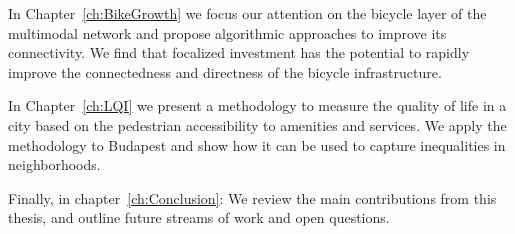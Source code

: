 In Chapter~\ref{ch:BikeGrowth} we focus our attention on the bicycle layer of the multimodal network and propose algorithmic approaches to improve its connectivity. We find that focalized investment has the potential to rapidly improve the connectedness and directness of the bicycle infrastructure.

In Chapter~\ref{ch:LQI} we present a methodology to measure the quality of life in a city based on the pedestrian accessibility to amenities and services. We apply the methodology to Budapest and show how it can be used to capture inequalities in neighborhoods.

Finally, in chapter~\ref{ch:Conclusion}: We review the main contributions from this thesis, and outline future streams of work and open questions. 